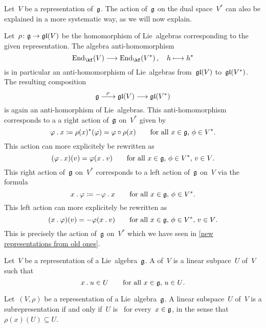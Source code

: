 \begin{remark}
  Let~$V$ be a representation of~$\mathfrak{g}$.
  The action of~$\mathfrak{g}$ on the dual space~$V^*$ can also be explained in a more systematic way, as we will now explain.

  Let~$\rho \colon \glie \to \gllie(V)$ be the homomorphism of Lie~algebras corresponding to the given representation.
  The algebra anti-homomorphism
  \[
    \End_{\kf}(V)
    \to
    \End_{\kf}(V^*) \,,
    \quad
    h
    \mapsto
    h^*
  \]
  is in particular an anti-homomorphism of Lie~algebras from~$\mathfrak{gl}(V)$ to~$\mathfrak{gl}(V^*)$.
  The resulting composition
  \[
    \glie
    \xto{\rho}
    \gllie(V)
    \to
    \gllie(V^*)
  \]
  is again an anti-homorphism of Lie~algebras.
  This anti-homomorphism corresponds to a a right action of~$\mathfrak{g}$ on~$V^*$ given by
  \[
    \varphi \mathbin{.} x
    \coloneqq
    \rho(x)^*(\varphi)
    =
    \varphi \circ \rho(x)
    \qquad
    \text{for all~$x \in \mathfrak{g}$,~$\phi \in V^*$.}
  \]
  This action can more explicitely be rewritten as
  \[
    (\varphi \mathbin{.} x)(v)
    =
    \varphi(x \mathbin{.} v)
    \qquad
    \text{for all~$x \in \mathfrak{g}$,~$\phi \in V^*$,~$v \in V$.}
  \]
  This right action of~$\mathfrak{g}$ on~$V^*$ corresponds to a left action of~$\mathfrak{g}$ on~$V$ via the formula
  \[
    x \mathbin{.} \varphi
    \coloneqq
    -\varphi \mathbin{.} x
    \qquad
    \text{for all~$x \in \mathfrak{g}$,~$\phi \in V^*$.}
  \]
  This left action can more explicitely be rewritten as
  \[
    (x \mathbin{.} \varphi)(v)
    =
    -\varphi(x \mathbin{.} v)
    \qquad
    \text{for all~$x \in \mathfrak{g}$,~$\phi \in V^*$,~$v \in V$.}
  \]
  This is precisely the action of~$\mathfrak{g}$ on~$V^*$ which we have seen in \cref{new representations from old ones}.
\end{remark}


\begin{definition}
  Let~$V$ be a representation of a Lie~algebra~$\mathfrak{g}$.
  A  of~$V$ is a linear subpace~$U$ of~$V$ such that
  \[
    x \mathbin{.} u \in U
    \qquad
    \text{for all~$x \in \mathfrak{g}$,~$u \in U$.}
  \]
\end{definition}


\begin{remark}
  Let~$(V, \rho)$ be a representation of a Lie~algebra~$\mathfrak{g}$.
  A linear subspace~$U$ of~$V$ is a subrepresentation if and only if~$U$ is~{} for every~$x \in \mathfrak{g}$, in the sense that~$\rho(x)(U) \subseteq U$.
\end{remark}


